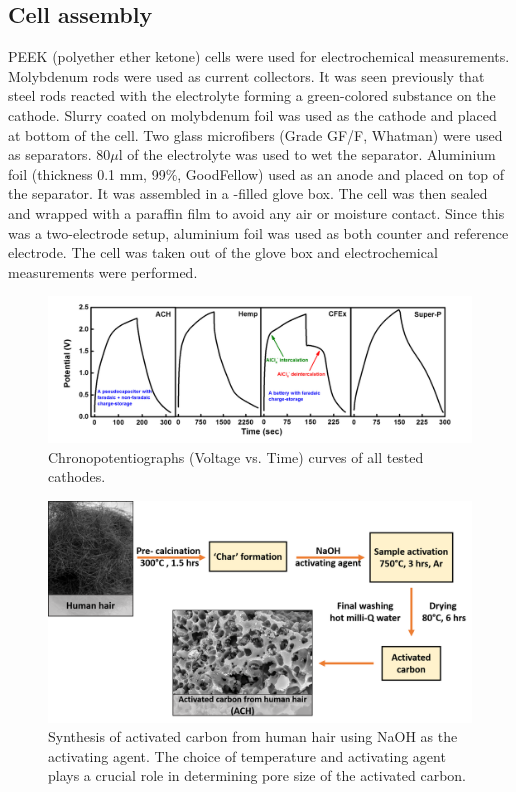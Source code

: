 \subsection{Cell assembly}
PEEK (polyether ether ketone) cells were used for electrochemical measurements. Molybdenum rods were used as current collectors. It was seen previously that steel rods reacted with the electrolyte forming a green-colored substance on the cathode. Slurry coated on molybdenum foil was used as the cathode and placed at bottom of the cell. Two glass microfibers (Grade GF/F, Whatman) were used as separators. 80$\mu$l of the electrolyte was used to wet the separator. Aluminium foil (thickness 0.1 mm, 99$\%$, GoodFellow) used as an anode and placed on top of the separator. It was assembled in a -filled glove box. The cell was then sealed and wrapped with a paraffin film to avoid any air or moisture contact. Since this was a two-electrode setup, aluminium foil was used as both counter and reference electrode. The cell was taken out of the glove box and electrochemical measurements were performed. 

\begin{figure}[tbh!]
  \centering
  \includegraphics[width=\textwidth]{Figures/chap5fig/gcdall}
    \caption{Chronopotentiographs (Voltage vs. Time) curves of all tested cathodes.}
  \label{Figures/chap5fig:gcdall}
\end{figure}

\begin{figure}[tbh!]
  \centering
  \includegraphics[width=\textwidth]{Figures/chap5fig/achsyn}
    \caption{Synthesis of activated carbon from human hair using NaOH as the activating agent. The choice of temperature and activating agent plays a crucial role in determining pore size of the activated carbon.}
  \label{Figures/chap5fig:achsyn}
\end{figure}

